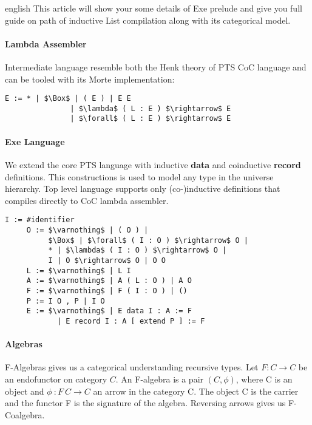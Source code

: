 \documentclass{abstract}
\begin{document}
\begin{theses}{english}
This article will show your some details of Exe prelude and give you full guide on path of inductive
List compilation along with its categorical model.

\paragraph{Lambda Assembler}

Intermediate language resemble both the Henk\cite{Henk} theory of PTS CoC language
and can be tooled with its Morte\cite{morte} implementation:

\begin{lstlisting}[mathescape=true]
    E := * | $\Box$ | ( E ) | E E 
               | $\lambda$ ( L : E ) $\rightarrow$ E 
               | $\forall$ ( L : E ) $\rightarrow$ E
\end{lstlisting}

\paragraph{Exe Language}

We extend the core PTS language with inductive {\bf data} and coinductive {\bf record} definitions.
This constructions is used to model any type in the universe hierarchy. Top level language supports
only (co-)inductive definitions that compiles directly to CoC lambda assembler.

\vspace{0.5cm}
\begin{lstlisting}[mathescape=true]
     I := #identifier
     O := $\varnothing$ | ( O ) |
          $\Box$ | $\forall$ ( I : O ) $\rightarrow$ O |
          * | $\lambda$ ( I : O ) $\rightarrow$ O |
          I | O $\rightarrow$ O | O O
     L := $\varnothing$ | L I
     A := $\varnothing$ | A ( L : O ) | A O
     F := $\varnothing$ | F ( I : O ) | ()
     P := I O , P | I O
     E := $\varnothing$ | E data I : A := F
            | E record I : A [ extend P ] := F
\end{lstlisting}

   \paragraph{Algebras}

   F-Algebras gives us a categorical understanding recursive types.
   Let $F : C \rightarrow C$ be an endofunctor on category $C$.
   An F-algebra is a pair $(C, \phi)$, where C is an object and $\phi\ : F\ C \rightarrow C$
   an arrow in the category C. The object C is the carrier and the functor
   F is the signature of the algebra. Reversing arrows gives us F-Coalgebra.


\end{theses}
\end{document}
